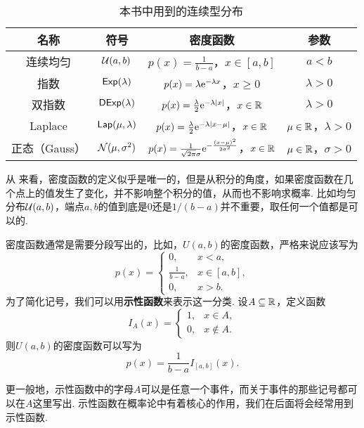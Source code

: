 \begin{table}[htbp]
\centering
\begin{tabular}{cccc}
\toprule
名称 & 符号 & 密度函数 & 参数 \\
\midrule
连续均匀\index{分布!连续均匀～} & $\mathcal{U}(a,b)$ &$p(x)=\frac{1}{b-a}$，$x\in[a,b]$ & $a<b$ \\
指数\index{分布!指数～} & $\mathsf{Exp}(\lambda)$ & $p(x)=\lambda \mathrm{e}^{-\lambda x}$，$x\geq 0$ & $\lambda>0$ \\
双指数\index{分布!双指数～} & $\mathsf{DExp}(\lambda)$ & $p(x)=\frac{\lambda}{2}\mathrm{e}^{-\lambda|x|}$，$x\in\mathbb{R}$ & $\lambda>0$ \\
Laplace\index{分布!Laplace～} & $\mathsf{Lap}(\mu,\lambda)$ & $p(x)=\frac{\lambda}{2}\mathrm{e}^{-\lambda|x-\mu|}$，$x\in\mathbb{R}$ & $\mu\in\mathbb{R}$，$\lambda>0$ \\
正态（Gauss）\index{分布!正态～}\index{分布!Gauss～} & $\mathcal{N}(\mu,\sigma^2)$ & $p(x)=\frac{1}{\sqrt{2\pi}\sigma}\mathrm{e}^{-\frac{(x-\mu)^2}{2\sigma^2}}$，$x\in\mathbb{R}$ & $\mu\in\mathbb{R}$，$\sigma>0$ \\
\bottomrule
\end{tabular}
\caption{本书中用到的连续型分布}
\label{tab:continuous-distribution}
\end{table}

\begin{remark}
从 来看，密度函数的定义似乎是唯一的，但是从积分的角度，如果密度函数在几个点上的值发生了变化，并不影响整个积分的值，从而也不影响求概率. 比如均匀分布$\mathcal{U}(a,b)$，端点$a,b$的值到底是$0$还是$1/(b-a)$并不重要，取任何一个值都是可以的.     
\end{remark}

\begin{remark}
密度函数通常是需要分段写出的，比如，$U(a,b)$的密度函数，严格来说应该写为
\[p(x)=\begin{cases}
    0,&x<a,\\
    \frac{1}{b-a},&x\in[a,b],\\
    0,&x>b.
\end{cases}\]
为了简化记号，我们可以用\textbf{示性函数}来表示这一分类. 设$A\subseteq\mathbb{R}$，定义函数
\[I_A(x)=\begin{cases}
    1,&x\in A,\\
    0,&x\notin A.
\end{cases}\]
则$U(a,b)$的密度函数可以写为
\[p(x)=\frac{1}{b-a}I_{[a,b]}(x).\]

更一般地，示性函数中的字母$A$可以是任意一个事件，而关于事件的那些记号都可以在$A$这里写出. 示性函数在概率论中有着核心的作用，我们在后面将会经常用到示性函数. 
\end{remark}


